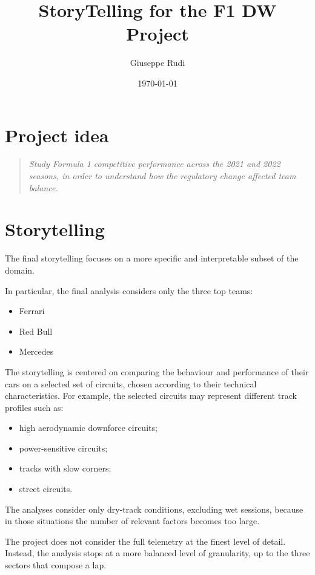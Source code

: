 \documentclass[12pt,a4paper]{article}
\title{StoryTelling for the F1 DW Project}
\author{Giuseppe Rudi}
\date{ \today}
\begin{document}
	
	\maketitle
	
	\section*{Project idea}
	
	\begin{quote}
		\textit{Study Formula 1 competitive performance across the 2021 and 2022 seasons, in order to understand how the regulatory change affected team balance.}
	\end{quote}
	
	\section*{Storytelling}
	
	The final storytelling focuses on a more specific and interpretable subset of the domain.
	
	In particular, the final analysis considers only the three top teams:
	\begin{itemize}
		\item Ferrari
		\item Red Bull
		\item Mercedes
	\end{itemize}
	
	The storytelling is centered on comparing the behaviour and performance of their cars on a selected set of circuits, chosen according to their technical characteristics. For example, the selected circuits may represent different track profiles such as:
	\begin{itemize}
		\item high aerodynamic downforce circuits;
		\item power-sensitive circuits;
		\item tracks with slow corners;
		\item street circuits.
	\end{itemize}
	
	The analyses consider only dry-track conditions, excluding wet sessions, because in those situations the number of relevant factors becomes too large.
	
	
	The project does not consider the full telemetry at the finest level of detail. Instead, the analysis stops at a more balanced level of granularity, up to the three sectors that compose a lap.
	
\end{document}
